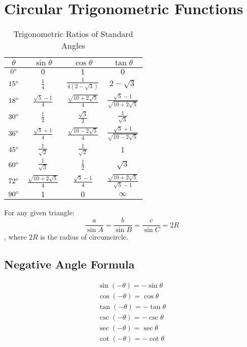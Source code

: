 \large{\chapter{Circular Trigonometric Functions}}
\begin{table}[H]
	\begin{center}
		\caption{Trigonometric Ratios of Standard Angles}
		\label{table1}
		\begin{tabular}{c|ccc}
			$\theta$&$\sin \theta$&$\cos \theta$&$\tan \theta$\\
			\hline
			$0\degree$&$0$&$1$&$0$\\
			$15\degree$&$\frac{1}{4}$&$\frac{1}{4(2-\sqrt{3})}$&$2-\sqrt{3}$\\
			$18\degree$&$\frac{\sqrt{5}-1}{4}$&$\frac{\sqrt{10+2\sqrt{5}}}{4}$&$\frac{\sqrt{5}-1}{\sqrt{10+2\sqrt{5}}}$\\
			$30\degree$&$\frac{1}{2}$&$\frac{\sqrt{3}}{2}$&$\frac{1}{\sqrt{3}}$\\
			$36\degree$&$\frac{\sqrt{5}+1}{4}$&$\frac{\sqrt{10-2\sqrt{5}}}{4}$&$\frac{\sqrt{5}+1}{\sqrt{10-2\sqrt{5}}}$\\
			$45\degree$&$\frac{1}{\sqrt{2}}$&$\frac{1}{\sqrt{2}}$&$1$\\
			$60\degree$&$\frac{1}{\sqrt{3}}$&$\frac{1}{2}$&$\sqrt{3}$\\
			$72\degree$&$\frac{\sqrt{10+2\sqrt{5}}}{4}$&$\frac{\sqrt{5}-1}{4}$&$\frac{\sqrt{10+2\sqrt{5}}}{\sqrt{5}-1}$\\
			$90\degree$&$1$&$0$&$\infty$\\
			\hline
		\end{tabular}
	\end{center}
\end{table}

For any given triangle:
\begin{equation}
	\dfrac{a}{\sin A}=\dfrac{b}{\sin B}=\dfrac{c}{\sin C}=2R
\end{equation}, where $2R$ is the radius of circumcircle.

\section{Negative Angle Formula}
\begin{align}
	\sin (-\theta)=-\sin \theta\\
	\cos (-\theta)=\cos \theta\\
	\tan (-\theta)=-\tan \theta\\
	\csc (-\theta)=-\csc \theta\\
	\sec (-\theta)=\sec \theta\\
	\cot (-\theta)=-\cot \theta
\end{align}


